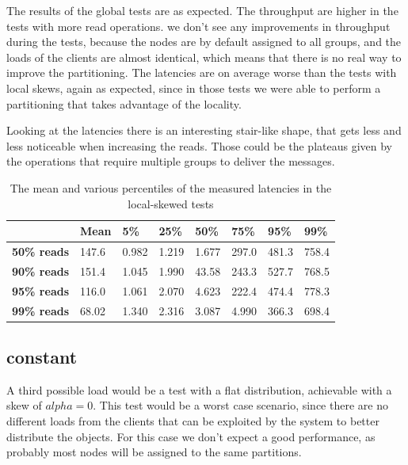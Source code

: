 The results of the global tests are as expected. The throughput are higher in the tests with more read operations. we don't see any improvements in throughput during the tests, because the nodes are by default assigned to all groups, and the loads of the clients are almost identical, which means that there is no real way to improve the partitioning. The latencies are on average worse than the tests with local skews, again as expected, since in those tests we were able to perform a partitioning that takes advantage of the locality.

Looking at the latencies there is an interesting stair-like shape, that gets less and less noticeable when increasing the reads. Those could be the plateaus given by the operations that require multiple groups to deliver the messages.



\begin{table}[!htb]
  \centering
  \begin{tabular}{l l l l l l l l}
    \hline
    & \textbf{Mean} & \textbf{5\%} & \textbf{25\%} & \textbf{50\%} & \textbf{75\%} & \textbf{95\%}& \textbf{99\%} \\
    \hline
    \textbf{50\% reads} & 147.6 & 0.982 & 1.219 & 1.677 & 297.0 & 481.3 & 758.4 \\
    \textbf{90\% reads} & 151.4 & 1.045 & 1.990 & 43.58 & 243.3 & 527.7 & 768.5 \\
    \textbf{95\% reads} & 116.0 & 1.061 & 2.070 & 4.623 & 222.4 & 474.4 & 778.3 \\
    \textbf{99\% reads} & 68.02 & 1.340 & 2.316 & 3.087 & 4.990 & 366.3 & 698.4 \\
    \hline
  \end{tabular}
  \caption{The mean and various percentiles of the measured latencies in the local-skewed tests}\label{tab:global-latencies-table}
\end{table}

\subsection{constant}\label{sec:constant}
A third possible load would be a test with a flat distribution, achievable with a skew of $alpha = 0$. This test would be a worst case scenario, since there are no different loads from the clients that can be exploited by the system to better distribute the objects. For this case we don't expect a good performance, as probably most nodes will be assigned to the same partitions.

